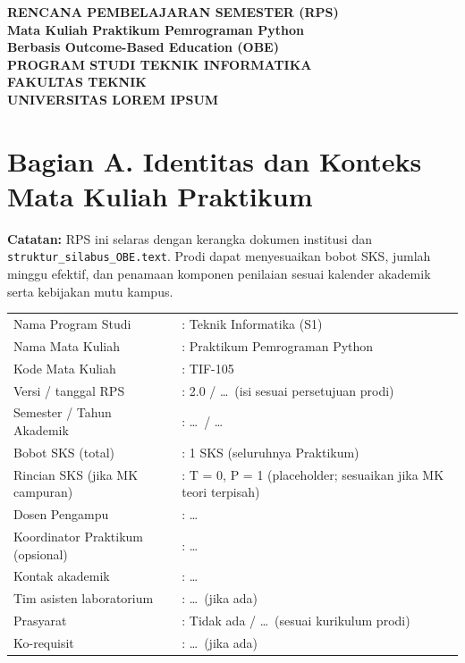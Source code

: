 \documentclass[12pt,a4paper]{article}
\begin{document}
\begin{center}
\textbf{\Large RENCANA PEMBELAJARAN SEMESTER (RPS)}\\
\textbf{Mata Kuliah Praktikum Pemrograman Python}\\
\textbf{Berbasis Outcome-Based Education (OBE)}\\[0.5cm]
\textbf{PROGRAM STUDI TEKNIK INFORMATIKA}\\
\textbf{FAKULTAS TEKNIK}\\
\textbf{UNIVERSITAS LOREM IPSUM}\\
\end{center}

\vspace{0.75cm}

\section*{Bagian A. Identitas dan Konteks Mata Kuliah Praktikum}

\noindent\textbf{Catatan:} RPS ini selaras dengan kerangka dokumen institusi dan \texttt{struktur\_silabus\_OBE.text}. Prodi dapat menyesuaikan bobot SKS, jumlah minggu efektif, dan penamaan komponen penilaian sesuai kalender akademik serta kebijakan mutu kampus.

\begin{tabular}{@{}p{5.2cm}p{9.5cm}@{}}
Nama Program Studi & : Teknik Informatika (S1) \\
Nama Mata Kuliah & : Praktikum Pemrograman Python \\
Kode Mata Kuliah & : TIF-105 \\
Versi / tanggal RPS & : 2.0 / \ldots\ (isi sesuai persetujuan prodi) \\
Semester / Tahun Akademik & : \ldots\ / \ldots \\
Bobot SKS (total) & : 1 SKS (seluruhnya Praktikum) \\
Rincian SKS (jika MK campuran) & : T = 0, P = 1 (placeholder; sesuaikan jika MK teori terpisah) \\
Dosen Pengampu & : \ldots \\
Koordinator Praktikum (opsional) & : \ldots \\
Kontak akademik & : \ldots \\
Tim asisten laboratorium & : \ldots\ (jika ada) \\
Prasyarat & : Tidak ada / \ldots\ (sesuai kurikulum prodi) \\
Ko-requisit & : \ldots\ (jika ada) \\
\end{tabular}
\end{document}
